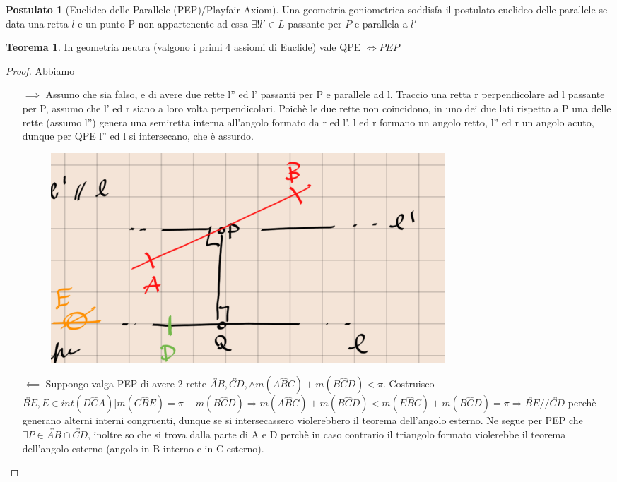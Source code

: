 \documentclass[a4paper,10pt]{article}
\theoremstyle{definition}
\theoremstyle{indentdefinition}
\theoremstyle{indentpostulate}
\newtheorem{post}{Postulato}[section]
\theoremstyle{indenttheorem}
\newtheorem{thm}{Teorema}[section]
\theoremstyle{myremark}
\theoremstyle{indentgeneral}
\newenvironment{myboxed} 
{\noindent\begin{lrbox}{\mybox}\begin{minipage}{\textwidth}}
{\end{minipage}\end{lrbox}\fbox{\usebox{\mybox}}}
\begin{document}
\begin{post}[Euclideo delle Parallele (PEP)/Playfair Axiom] 
    Una geometria goniometrica soddisfa il postulato euclideo delle parallele se data una retta $l$ e un punto P non appartenente ad essa $\exists ! l' \in L$ passante per $P$ e parallela a $l'$
\end{post} 

\begin{myboxed}
\begin{thm} In geometria neutra (valgono i primi 4 assiomi di Euclide) vale QPE $\iff PEP$ \end{thm} 
\end{myboxed}

\begin{proof}   Abbiamo
\begin{itemize}
    \item[$\implies$] Assumo che sia falso, e di avere due rette l'' ed l' passanti per P e parallele ad l. Traccio una retta r perpendicolare ad l passante per P, assumo che l' ed r siano a loro volta perpendicolari. Poichè le due rette non coincidono, in uno dei due lati rispetto a P una delle rette (assumo l'') genera una semiretta interna all'angolo formato da r ed l'. l ed r formano un angolo retto, l'' ed r un angolo acuto, dunque per QPE l'' ed l si intersecano, che è assurdo.   
    \begin{figure}[H]
    \centering
    \includegraphics[scale=0.5]{Euclide1.png}
\end{figure}
    \item[$\impliedby$] Suppongo valga PEP di avere 2 rette $\overleftrightarrow{AB}, \overleftrightarrow{CD}, \land m(A \hat{B}C)+m(B\hat{C}D)<\pi $. Costruisco $\overleftrightarrow{BE}, E \in int(D\hat{C}A)|m(C\hat{B}E)=\pi -m(B\hat{C}D) \Rightarrow m(A\hat{B}C)+m(B\hat{C}D)<m(E\hat{B}C)+m(B\hat{C}D)=\pi \Rightarrow \overleftrightarrow{BE}// \overleftrightarrow{CD}$ perchè generano alterni interni congruenti, dunque se si intersecassero violerebbero il teorema dell'angolo esterno. Ne segue per PEP che $\exists P\in \overleftrightarrow{AB} \cap \overleftrightarrow{CD}$, inoltre so che si trova dalla parte di A e D perchè in caso contrario il triangolo formato violerebbe il teorema dell'angolo esterno (angolo in B interno e in C esterno).
\end{itemize}
\end{proof} 
\end{document}
